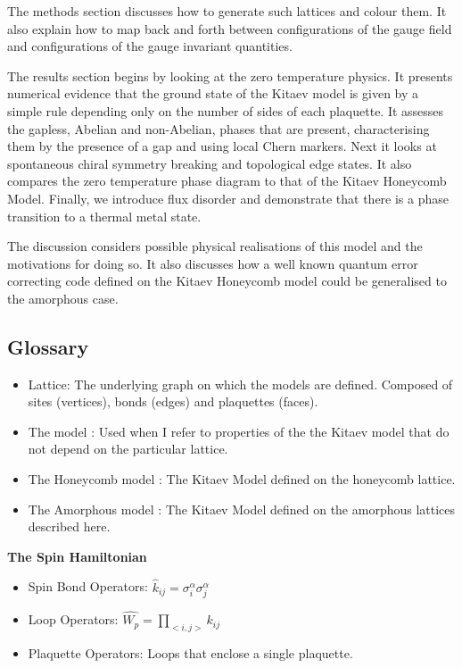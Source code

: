 The methods section discusses how to generate such lattices and colour them. It also explain how to map back and forth between configurations of the gauge field and configurations of the gauge invariant quantities.

The results section begins by looking at the zero temperature physics. It presents numerical evidence that the ground state of the Kitaev model is given by a simple rule depending only on the number of sides of each plaquette. It assesses the gapless, Abelian and non-Abelian, phases that are present, characterising them by the presence of a gap and using local Chern markers. Next it looks at spontaneous chiral symmetry breaking and topological edge states. It also compares the zero temperature phase diagram to that of the Kitaev Honeycomb Model. Finally, we introduce flux disorder and demonstrate that there is a phase transition to a thermal metal state.

The discussion considers possible physical realisations of this model and the motivations for doing so. It also discusses how a well known quantum error correcting code defined on the Kitaev Honeycomb model could be generalised to the amorphous case.

\hypertarget{glossary}{%
\subsection{Glossary}\label{glossary}}

\begin{itemize}
\item
  Lattice: The underlying graph on which the models are defined. Composed of sites (vertices), bonds (edges) and plaquettes (faces).
\item
  The model : Used when I refer to properties of the the Kitaev model that do not depend on the particular lattice.
\item
  The Honeycomb model : The Kitaev Model defined on the honeycomb lattice.
\item
  The Amorphous model : The Kitaev Model defined on the amorphous lattices described here.
\end{itemize}

\textbf{The Spin Hamiltonian}

\begin{itemize}
\tightlist
\item
  Spin Bond Operators: \(\hat{k}_{ij} = \sigma_i^\alpha \sigma_j^\alpha\)
\item
  Loop Operators: \(\hat{W_p} = \prod_{<i,j>} k_{ij}\)
\item
  Plaquette Operators: Loops that enclose a single plaquette.
\end{itemize}

